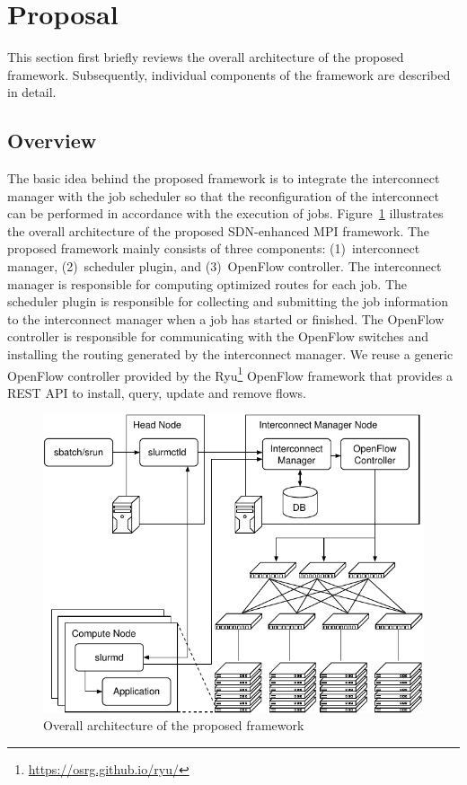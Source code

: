 \documentclass[graybox]{svmult}
\begin{document}
\section{Proposal}\label{kt:sec:iii}

This section first briefly reviews the overall architecture of the proposed
framework. Subsequently, individual components of the framework are described
in detail.

\subsection{Overview}

The basic idea behind the proposed framework is to integrate the interconnect
manager with the job scheduler so that the reconfiguration of the interconnect
can be performed in accordance with the execution of jobs.
Figure~\ref{kt:fig:architecture} illustrates the overall architecture of the
proposed SDN-enhanced MPI framework. The proposed framework mainly consists of
three components: (1)~interconnect manager, (2)~scheduler plugin, and
(3)~OpenFlow controller. The interconnect manager is responsible for computing
optimized routes  for each job. The scheduler plugin is responsible for
collecting and submitting the job information to the interconnect manager when
a job has started or finished. The OpenFlow controller is responsible for
communicating with the OpenFlow switches and installing the routing generated
by the interconnect manager. We reuse a generic OpenFlow controller provided
by the Ryu\footnote{\url{https://osrg.github.io/ryu/}} OpenFlow framework that
provides a REST API to install, query, update and remove flows.

\begin{figure}
    \centering
    \includegraphics{architecture}
    \caption{Overall architecture of the proposed framework}%
    \label{kt:fig:architecture}
\end{figure}
\end{document}
